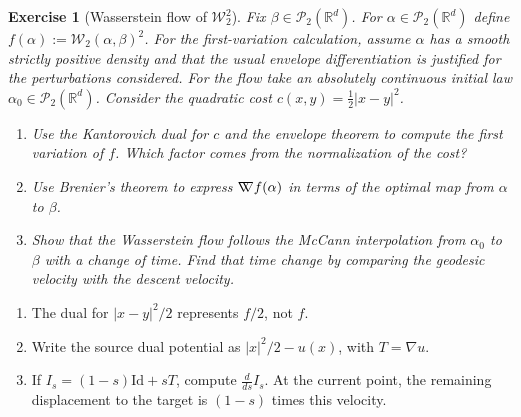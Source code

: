 \documentclass[11pt,a4paper]{article}
\theoremstyle{exostyle}
\newtheorem{exercise}{Exercise}
\newcommand{\R}{\mathbb{R}}
\newcommand{\Wtwo}{\mathcal{W}_2}
\newcommand{\gradW}{\mathord{\nabla\mkern-9.3mu\nabla}}
\begin{document}
\begin{exercise}[Wasserstein flow of $\Wtwo^2$]\label{ex:rigorous-W2-squared}
Fix $\beta\in\mathcal P_2(\mathbb{R}^d)$. For $\alpha\in\mathcal P_2(\mathbb{R}^d)$ define
$f(\alpha) := \Wtwo(\alpha,\beta)^2$.
For the first-variation calculation, assume $\alpha$ has a smooth strictly positive density and that the usual envelope differentiation is justified for the perturbations considered. For the flow take an absolutely continuous initial law $\alpha_0\in\mathcal P_2(\R^d)$. Consider the quadratic cost
$c(x,y) = \frac12|x-y|^2$.

\begin{enumerate}[label=\textbf{(\arabic*)}]
  \item Use the Kantorovich dual for $c$ and the envelope theorem to
    compute the first variation of $f$. Which factor comes from the
    normalization of the cost?

  \item Use Brenier's theorem to express $\gradW f(\alpha)$ in terms of the optimal map from $\alpha$ to $\beta$.


  \item Show that the Wasserstein flow follows the McCann interpolation
    from $\alpha_0$ to $\beta$ with a change of time. Find that time
    change by comparing the geodesic velocity with the descent velocity.

\end{enumerate}
\end{exercise}
\begin{hints}
\begin{enumerate}[label=(\arabic*)]\item The dual for $|x-y|^2/2$ represents $f/2$, not $f$.\item Write the source dual potential as $|x|^2/2-u(x)$, with $T=\nabla u$.\item If $I_s=(1-s)\mathrm{Id}+sT$, compute $\frac d{ds}I_s$. At the current point, the remaining displacement to the target is $(1-s)$ times this velocity.\end{enumerate}
\end{hints}
\end{document}
